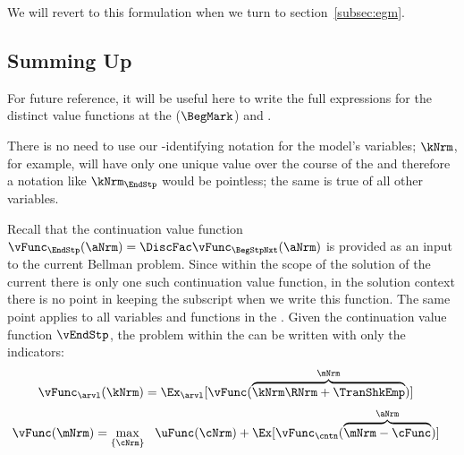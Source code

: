 We will revert to this formulation when we turn to section~\ref{subsec:egm}.

\hypertarget{summing-up}{}
\subsection{Summing Up}\label{subsec:summing-up}
For future reference, it will be useful here to write the full expressions for the distinct value functions at the {\Arrival} ($\BegMark$) and {\Decision} {\moves}.  %

There is no need to use our {\interval}-identifying notation for the model's variables; $\kNrm$, for example, will have only one unique value over the course of the {\interval} and therefore a notation like $\kNrm_{\EndStp}$ would be pointless; the same is true of all other variables.

Recall that the continuation value function $\vFunc_{\EndStp}(\aNrm)=\DiscFac \vFunc_{\BegStpNxt}(\aNrm)$ is provided as an input to the current {\stg} Bellman problem.  Since within the scope of the solution of the current {\stg} there is only one such continuation value function, in the solution context there is no point in keeping the {\interval} subscript when we write this function.  The same point applies to all variables and functions in the {\stg}.  Given the continuation value function $\vEndStp$, the problem within the {\stg} can be written with only the {\move} indicators:
  \begin{equation}\begin{gathered}\begin{aligned}
        \vFunc_{\arvl}(\kNrm) & = \Ex_{\arvl}[\vFunc(\overbrace{\kNrm \RNrm + \TranShkEmp}^{\mNrm})]  \label{eq:vBegStp}
      \end{aligned}\end{gathered}\end{equation}
  \begin{equation}\begin{gathered}\begin{aligned}
        \vFunc(\mNrm) & = \max_{\{{\cNrm}\}}~~\uFunc({\cNrm}) +\Ex[ \vFunc_{\cntn}(\overbrace{\mNrm-\cFunc}^{\aNrm})] \label{eq:vMid}
      \end{aligned}\end{gathered}\end{equation}

